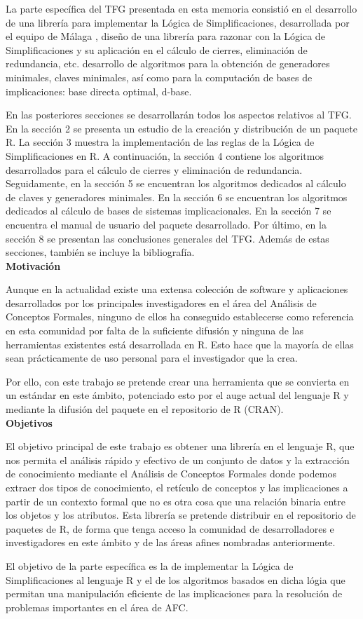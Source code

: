 La parte espec\'ifica del TFG presentada en esta memoria consisti\'o en el desarrollo de una librer\'ia para implementar la L\'ogica de Simplificaciones, desarrollada por el equipo de M\'alaga \cite{Cordero2002}, dise\~no de una librer\'ia para razonar con la L\'ogica de Simplificaciones y su aplicaci\'on en el c\'alculo de cierres, eliminaci\'on de redundancia, etc. desarrollo de algoritmos para la obtenci\'on de generadores minimales, claves minimales, as\'i como para la computaci\'on de bases de implicaciones: base directa optimal, d-base. 

En las posteriores secciones se desarrollar\'an todos los aspectos relativos al TFG. En la secci\'on 2 se presenta un estudio de la creaci\'on y distribuci\'on de un paquete R. La secci\'on 3 muestra la implementaci\'on de las reglas de la L\'ogica de Simplificaciones en R. A continuaci\'on, la secci\'on 4 contiene los algoritmos desarrollados para el c\'alculo de cierres y eliminaci\'on de redundancia. Seguidamente, en la secci\'on 5 se encuentran los algoritmos dedicados al c\'alculo de claves y generadores minimales. En la secci\'on 6 se encuentran los algoritmos dedicados al c\'alculo de bases de sistemas implicacionales. En la secci\'on 7 se encuentra el manual de usuario del paquete desarrollado. Por \'ultimo, en la secci\'on 8 se presentan las conclusiones generales del TFG. Adem\'as de estas secciones, tambi\'en se incluye la bibliograf\'ia.\\

\textbf{Motivaci\'on}

Aunque en la actualidad existe una extensa colecci\'on de software y aplicaciones desarrollados por los principales investigadores en el \'area del  An\'alisis de Conceptos Formales, ninguno de ellos ha conseguido establecerse como referencia en esta comunidad por falta de la suficiente difusi\'on y ninguna de las herramientas existentes est\'a desarrollada en R. Esto hace que la mayor\'ia de ellas sean pr\'acticamente de uso personal para el investigador que la crea. 

Por ello, con este trabajo se pretende crear una herramienta que se convierta en un est\'andar en este \'ambito, potenciado esto por el auge actual del lenguaje R y mediante la difusi\'on del paquete en el repositorio de R (CRAN).\\


\textbf{Objetivos}

El objetivo principal de este trabajo es obtener una librer\'ia en el lenguaje R, que nos permita el an\'alisis r\'apido y efectivo de un conjunto de datos y la extracci\'on de conocimiento mediante el An\'alisis de Conceptos Formales donde podemos extraer dos tipos de conocimiento, el ret\'iculo de conceptos y las implicaciones a partir de un contexto formal que no es otra cosa que una relaci\'on binaria entre los objetos y los atributos. Esta librer\'ia se pretende distribuir en el repositorio de paquetes de R, de forma que tenga acceso la comunidad de desarrolladores e investigadores en este \'ambito y de las \'areas afines nombradas anteriormente. 

El objetivo de la parte espec\'ifica es la de implementar la L\'ogica de Simplificaciones al lenguaje R y el de los algoritmos basados en dicha l\'ogia que permitan una manipulaci\'on eficiente de las implicaciones para la resoluci\'on de problemas importantes en el \'area de AFC.

\newpage